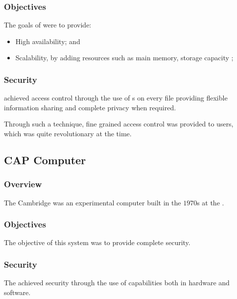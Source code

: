 
\begin{frame}
  \frametitle{Objectives}

  The goals of  were to provide:

  \begin{itemize}
    \item
      High availability; and
    \item
      Scalability, by adding resources such as main memory, storage capacity
      \etc{};
  \end{itemize}
\end{frame}


\begin{frame}
  \frametitle{Security}

   achieved access control through the use of s on every file providing flexible information sharing and
  complete privacy when required.

  \-

  Through such a technique, fine grained access control was provided to users,
  which was quite revolutionary at the time.
\end{frame}


\subsection{CAP Computer}


\begin{frame}
  \frametitle{Overview}

  The Cambridge  was an experimental computer built
  in the $1970$s at the .
\end{frame}


\begin{frame}
  \frametitle{Objectives}

  The objective of this system was to provide complete security.
\end{frame}


\begin{frame}
  \frametitle{Security}

  The  achieved security through the use of capabilities
  both in hardware and software.
\end{frame}

